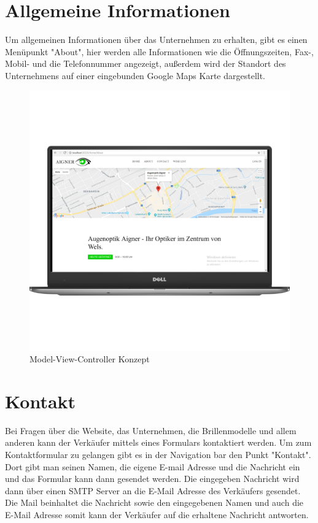 \section{Allgemeine Informationen}
Um allgemeinen Informationen über das Unternehmen zu erhalten, gibt es einen Menüpunkt "About", hier werden alle Informationen wie die Öffnungszeiten, Fax-, Mobil- und die Telefonnummer angezeigt, außerdem wird der Standort des Unternehmens auf einer eingebunden Google Maps Karte dargestellt.

\begin{figure}[H]
\begin{center}
	\includegraphics[scale=.2]{images/About.png}
\end{center}
	\caption{Model-View-Controller Konzept}
	\label{fig:sample}
\end{figure}

\section{Kontakt}
Bei Fragen über die Website, das Unternehmen, die Brillenmodelle und allem anderen kann der Verkäufer mittels eines Formulars kontaktiert werden. Um zum Kontaktformular zu gelangen gibt es in der Navigation bar den Punkt "Kontakt". Dort gibt man seinen Namen, die eigene E-mail Adresse und die Nachricht ein und das Formular kann dann gesendet werden. Die eingegeben Nachricht wird dann über einen SMTP Server an die E-Mail Adresse des Verkäufers gesendet. Die Mail beinhaltet die Nachricht sowie den eingegebenen Namen und auch die E-Mail Adresse somit kann der Verkäufer auf die erhaltene Nachricht antworten.

